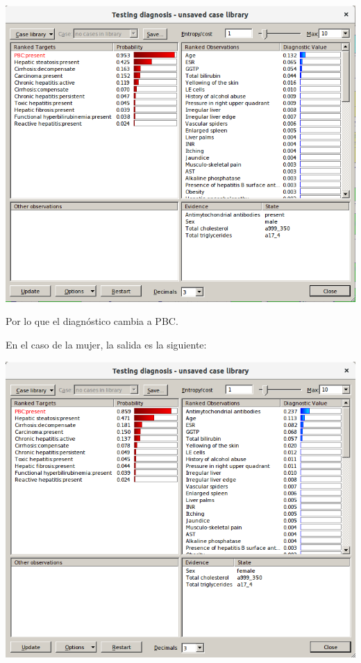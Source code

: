 \documentclass{article}
\begin{document}
\begin{enumerate}[label=\alph*)]
\begin{flushleft}
\includegraphics[scale=0.4]{hepasol.png}
\end{flushleft}

Por lo que el diagnóstico cambia a PBC.

En el caso de la mujer, la salida es la siguiente:
\begin{flushleft}
\includegraphics[scale=0.4]{hepaSOL2.png}
\end{flushleft}


\end{enumerate}
\end{document}
